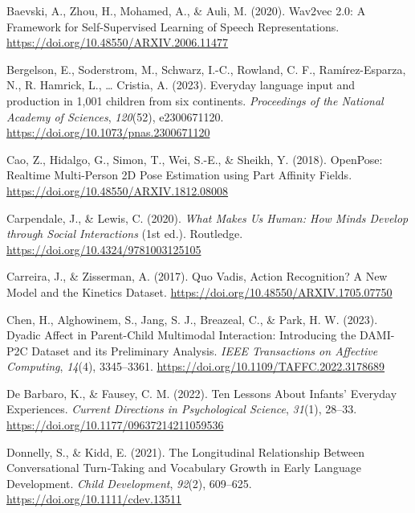 \documentclass[
  man,floatsintext]{apa6}
\newlength{\cslhangindent}
\newenvironment{CSLReferences}[2] %
 {\begin{list}{}{%
  \setlength{\itemindent}{0pt}
  \setlength{\leftmargin}{0pt}
  \setlength{\parsep}{0pt}
  \ifodd #1
   \setlength{\leftmargin}{\cslhangindent}
   \setlength{\itemindent}{-1\cslhangindent}
  \fi
  \setlength{\itemsep}{#2\baselineskip}}}
 {\end{list}}
\begin{document}
\begingroup
\setlength{\parindent}{-0.5in}
\setlength{\leftskip}{0.5in}

\label{refs}
\begin{CSLReferences}{1}{0}
Baevski, A., Zhou, H., Mohamed, A., \& Auli, M. (2020). Wav2vec 2.0: {A Framework} for {Self-Supervised Learning} of {Speech Representations}. \url{https://doi.org/10.48550/ARXIV.2006.11477}

Bergelson, E., Soderstrom, M., Schwarz, I.-C., Rowland, C. F., Ramírez-Esparza, N., R. Hamrick, L., \ldots{} Cristia, A. (2023). Everyday language input and production in 1,001 children from six continents. \emph{Proceedings of the National Academy of Sciences}, \emph{120}(52), e2300671120. \url{https://doi.org/10.1073/pnas.2300671120}

Cao, Z., Hidalgo, G., Simon, T., Wei, S.-E., \& Sheikh, Y. (2018). {OpenPose}: {Realtime Multi-Person 2D Pose Estimation} using {Part Affinity Fields}. \url{https://doi.org/10.48550/ARXIV.1812.08008}

Carpendale, J., \& Lewis, C. (2020). \emph{What {Makes Us Human}: {How Minds Develop} through {Social Interactions}} (1st ed.). Routledge. \url{https://doi.org/10.4324/9781003125105}

Carreira, J., \& Zisserman, A. (2017). Quo {Vadis}, {Action Recognition}? {A New Model} and the {Kinetics Dataset}. \url{https://doi.org/10.48550/ARXIV.1705.07750}

Chen, H., Alghowinem, S., Jang, S. J., Breazeal, C., \& Park, H. W. (2023). Dyadic {Affect} in {Parent-Child Multimodal Interaction}: {Introducing} the {DAMI-P2C Dataset} and its {Preliminary Analysis}. \emph{IEEE Transactions on Affective Computing}, \emph{14}(4), 3345--3361. \url{https://doi.org/10.1109/TAFFC.2022.3178689}

De Barbaro, K., \& Fausey, C. M. (2022). Ten {Lessons About Infants}' {Everyday Experiences}. \emph{Current Directions in Psychological Science}, \emph{31}(1), 28--33. \url{https://doi.org/10.1177/09637214211059536}

Donnelly, S., \& Kidd, E. (2021). The {Longitudinal Relationship Between Conversational Turn}‐{Taking} and {Vocabulary Growth} in {Early Language Development}. \emph{Child Development}, \emph{92}(2), 609--625. \url{https://doi.org/10.1111/cdev.13511}


\end{CSLReferences}
\end{document}
